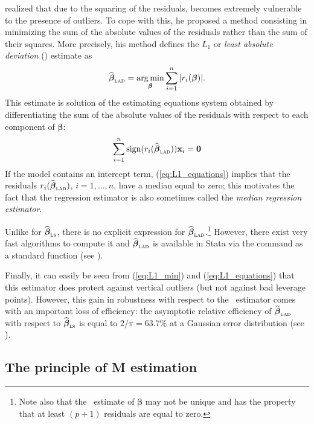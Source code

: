 \citet{edgeworth:1887} realized that due to the squaring of the residuals,
 becomes extremely vulnerable to the presence of outliers. To cope
with this, he proposed a method consisting in minimizing the sum of the
absolute values of the residuals rather than the sum of their squares. More
precisely, his method defines the $L_1$ or \emph{least absolute deviation}
() estimate as
%
\begin{equation}\label{eq:L1_min}
    \sthat{\boldsymbol\beta}_{\stsc{LAD}} 
        = \argmin_{\boldsymbol\beta} \sum_{i=1}^{n} |r_i(\boldsymbol\beta)|.
\end{equation}
%
This estimate is solution of the estimating equations system obtained by
differentiating the sum of the absolute values of the residuals with respect
to each component of $\boldsymbol\beta$:
%
\begin{equation}\label{eq:L1_equations}
    \sum_{i=1}^{n}\sign(r_i(\sthat{\boldsymbol\beta}_{\stsc{LAD}})) 
    \stvec{x}_i = \stvec{0}
\end{equation}
%
If the model contains an intercept term, (\ref{eq:L1_equations}) implies that
the residuals $r_i(\sthat{\boldsymbol\beta}_{\stsc{LAD}})$, $i = 1, \dots,
n$, have a median equal to zero; this motivates the fact that the 
regression estimator is also sometimes called the \emph{median regression
estimator}.

Unlike for $\sthat{\boldsymbol\beta}_\stsc{LS}$, there is no explicit
expression for $\sthat{\boldsymbol\beta}_{\stsc{LAD}}$.\footnote{Note also that
the ~estimate of $\boldsymbol\beta$ may not be unique and has the
property that at least $(p+1)$ residuals are equal to zero.} However, there
exist very fast algorithms to compute it and
$\sthat{\boldsymbol{\beta}}_{\stsc{LAD}}$ is available in Stata via the
 command as a standard function (see ).

Finally, it can easily be seen from (\ref{eq:L1_min}) and
(\ref{eq:L1_equations}) that this estimator does protect against vertical
outliers (but not against bad leverage points). However, this gain in
robustness with respect to the ~estimator comes with an important loss
of efficiency: the asymptotic relative efficiency of
$\sthat{\boldsymbol{\beta}}_{\stsc{LAD}}$ with respect to
$\sthat{\boldsymbol\beta}_\stsc{LS}$ is equal to $2/\pi = 63.7\%$ at a
Gaussian error distribution (see \citealp{huber:1981}).

\subsection{The principle of M estimation}

